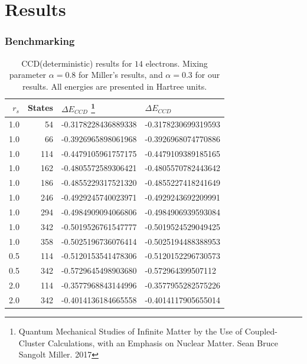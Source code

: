 \documentclass{beamer}
\begin{document}
\section{Results}
\begin{frame}
\frametitle{Benchmarking}
\begin{table}[h]
	\centering
	\caption{\tiny CCD(deterministic) results for $14$ electrons. Mixing parameter $\alpha=0.8$ for Miller's results, and $\alpha=0.3$ for our results. All energies are presented in Hartree units.} \label{tab:CCDcompar}
	\tiny  %
	\begin{tabular}{rrll}
		$r_s$ & States & $\Delta E_{CCD}$ \footnote{\tiny Quantum Mechanical Studies of Infinite Matter by the Use of Coupled-Cluster Calculations, with an Emphasis on Nuclear Matter. Sean Bruce Sangolt Miller. 2017}  & $\Delta E_{CCD}$\\
		\hline
		\hline
		1.0 & 54 & -0.3178228436889338 & -0.3178230699319593  \\
		1.0 & 66 & -0.3926965898061968 & -0.3926968074770886  \\
		1.0 & 114 & -0.4479105961757175 & -0.4479109389185165  \\
		1.0 & 162 & -0.4805572589306421 & -0.4805570782443642  \\
		1.0 & 186 & -0.4855229317521320 & -0.4855227418241649  \\
		1.0 & 246 & -0.4929245740023971 & -0.4929243692209991  \\
		1.0 & 294 & -0.4984909094066806 & -0.4984906939593084  \\
		1.0 & 342 & -0.5019526761547777 & -0.5019524529049425  \\
		1.0 & 358 & -0.5025196736076414 & -0.5025194488388953  \\ \hline
		0.5 & 114 & -0.5120153541478306 & -0.5120152296730573  \\
		0.5 & 342 & -0.5729645498903680 & -0.572964399507112   \\ \hline    
		2.0 & 114 & -0.3577968843144996 & -0.3577955282575226  \\
		2.0 & 342 & -0.4014136184665558 & -0.4014117905655014  \\
	\end{tabular}
\end{table}

\end{frame}
\end{document}
